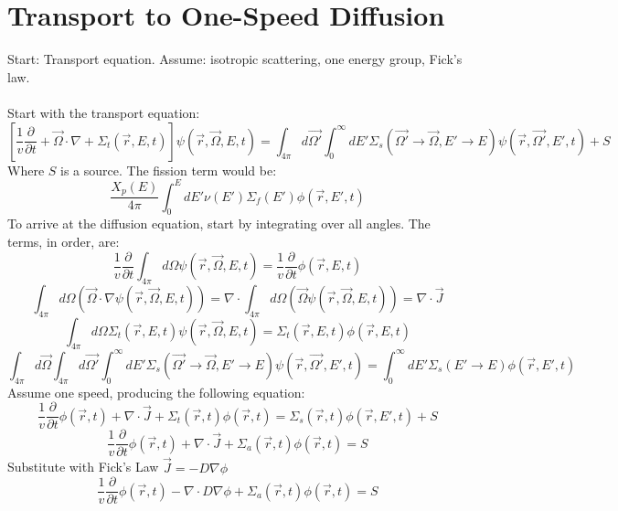 \documentclass[]{article}
\begin{document}
		\section*{\textbf{Transport to One-Speed Diffusion}}
		Start: Transport equation. Assume: isotropic scattering, one energy group, Fick's law.\\\\
		Start with the transport equation:
		\[
		\left[\frac{1}{v}\frac{\partial}{\partial t} + \vec{\Omega} \cdot \nabla +\Sigma_t(\vec{r}, E, t)\right]\psi(\vec{r},\vec{\Omega}, E, t) = \int_{4\pi}d\vec{\Omega '}\int_{0}^{\infty}dE' \Sigma_s(\vec{\Omega '}\rightarrow\vec{\Omega}, E' \rightarrow E)\psi(\vec{r},\vec{\Omega '}, E', t)+S 
		\]
		Where $S$ is a source. The fission term would be:
		\[
		\frac{X_p(E)}{4\pi}\int_{0}^{E}dE'\nu(E')\Sigma_f(E')\phi(\vec{r}, E', t)
		\]
		To arrive at the diffusion equation, start by integrating over all angles. The terms, in order, are:
		\[
		\frac{1}{v}\frac{\partial}{\partial t}\int_{4\pi}d\Omega\psi(\vec{r},\vec{\Omega}, E, t) = \frac{1}{v}\frac{\partial}{\partial t}\phi(\vec{r}, E, t)
		\]
		\[
		\int_{4\pi}d\Omega(\vec{\Omega} \cdot \nabla \psi(\vec{r},\vec{\Omega}, E, t)) = \nabla \cdot\int_{4\pi}d\Omega(\vec{\Omega} \psi(\vec{r},\vec{\Omega}, E, t)) = \nabla \cdot \vec{J} 
		\]
		\[
		\int_{4\pi}d\Omega\Sigma_t(\vec{r}, E, t)\psi(\vec{r},\vec{\Omega}, E, t) = \Sigma_t(\vec{r}, E, t)\phi(\vec{r}, E, t) 
		\]
		\[
		\int_{4\pi}d\vec{\Omega}\int_{4\pi}d\vec{\Omega '}\int_{0}^{\infty}dE' \Sigma_s(\vec{\Omega '}\rightarrow\vec{\Omega}, E' \rightarrow E)\psi(\vec{r},\vec{\Omega '}, E', t) = \int_{0}^{\infty}dE' \Sigma_s( E' \rightarrow E)\phi(\vec{r}, E', t)
		\]
		Assume one speed, producing the following equation:
		\[
		\frac{1}{v}\frac{\partial}{\partial t}\phi(\vec{r}, t) + \nabla \cdot \vec{J} +\Sigma_t(\vec{r}, t)\phi(\vec{r}, t) =  \Sigma_s(\vec{r}, t)\phi(\vec{r}, E', t)+S
		\]
		\[
		\frac{1}{v}\frac{\partial}{\partial t}\phi(\vec{r}, t) + \nabla \cdot \vec{J} +\Sigma_a(\vec{r}, t)\phi(\vec{r}, t) = S	
		\]
		Substitute with Fick's Law $\vec{J} = -D\nabla\phi$
		\[
		\frac{1}{v}\frac{\partial}{\partial t}\phi(\vec{r}, t) - \nabla \cdot D\nabla\phi +\Sigma_a(\vec{r}, t)\phi(\vec{r}, t) = S	
		\]
		
		
\end{document}
